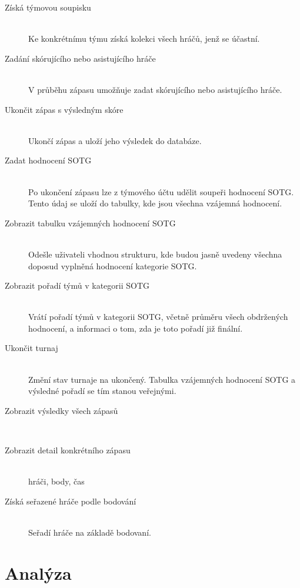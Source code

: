 \documentclass[thesis=B,czech]{FITthesis}[2012/06/26]
\begin{document}
\begin{description}
 \item[Získá týmovou soupisku] \hfill \\
 Ke konkrétnímu týmu získá kolekci všech hráčů, jenž se účastní.
 
 \item[Zadání skórujícího nebo asistujícího hráče] \hfill \\
 V průběhu zápasu umožňuje zadat skórujícího nebo asistujícího hráče.
 
 \item[Ukončit zápas s výsledným skóre] \hfill \\
 Ukončí zápas a uloží jeho výsledek do databáze.
 
 \item[Zadat hodnocení SOTG] \hfill \\
 Po ukončení zápasu lze z týmového účtu udělit soupeři hodnocení SOTG. Tento údaj se uloží do tabulky, kde jsou všechna vzájemná hodnocení. 
 
 \item[Zobrazit tabulku vzájemných hodnocení SOTG] \hfill \\
 Odešle uživateli vhodnou strukturu, kde budou jasně uvedeny všechna doposud vyplněná hodnocení kategorie SOTG.
 
 \item[Zobrazit pořadí týmů v kategorii SOTG] \hfill \\
 Vrátí pořadí týmů v kategorii SOTG, včetně průměru všech obdržených hodnocení, a informaci o tom, zda je toto pořadí již finální.
 
 \item[Ukončit turnaj] \hfill \\
 Změní stav turnaje na ukončený. Tabulka vzájemných hodnocení SOTG a výsledné pořadí se tím stanou veřejnými. 
 
 \item[Zobrazit výsledky všech zápasů] \hfill \\
 
 \item[Zobrazit detail konkrétního zápasu] \hfill \\ hráči, body, čas
 
 \item[Získá seřazené hráče podle bodování] \hfill \\ Seřadí hráče na základě bodovaní.
\end{description}

\chapter{Analýza}
\end{document}
